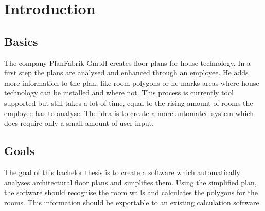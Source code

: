 \chapter{Introduction}
\section{Basics}
The company PlanFabrik GmbH creates floor plans for house technology. In a first step the plans are analysed and enhanced through an employee. He adds more information to the plan, like room polygons or he marks areas where house technology can be installed and where not.
\newline
\newline
This process is currently tool supported but still takes a lot of time, equal to the rising amount of rooms the employee has to analyse. The idea is to create a more automated system which does require only a small amount of user input.

\section{Goals}
The goal of this bachelor thesis is to create a software which automatically analyses architectural floor plans and simplifies them. Using the simplified plan, the software should recognise the room walls and calculates the polygons for the rooms. This information should be exportable to an existing calculation software.